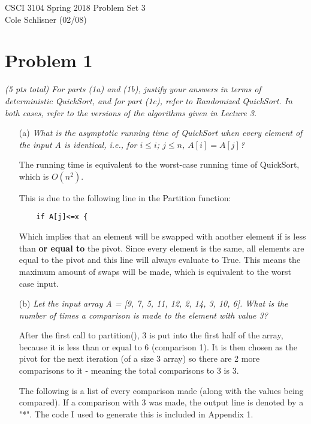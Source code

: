 \documentclass[12pt]{article} \setlength{\oddsidemargin}{0in}
\begin{document}
\noindent CSCI 3104 Spring 2018 \hfill Problem Set 3\\
Cole Schlisner (02/08)

\hrulefill

{\selectfont

  \section*{Problem 1}

  \textit{(5 pts total) For parts (1a) and (1b), justify your answers
    in terms of deterministic QuickSort, and for part (1c), refer to
    Randomized QuickSort. In both cases, refer to the versions of the
    algorithms given in Lecture 3.}

  \begin{enumerate}
  \item[(a)]{\textit{What is the asymptotic running time of QuickSort when
      every element of the input A is identical, i.e., for $i \le i$;
      $j \le n$, $A[i] = A[j]$?}}
    
    The running time is equivalent to the worst-case running time of QuickSort, which is $O(n^2)$. 

    This is due to the following line in the Partition function: 
    \begin{verbatim}
    if A[j]<=x {
    \end{verbatim}

    Which implies that an element will be swapped with another element if is less than \textbf{or equal to} the pivot. Since every element is the same, all elements are equal to the pivot and this line will always evaluate to True. This means the maximum amount of swaps will be made, which is equivalent to the worst case input. 

    \newpage

  \item[(b)]{\textit{Let the input array A = [9, 7, 5, 11, 12, 2, 14, 3, 10,
      6]. What is the number of times a comparison is made to the
      element with value 3?}}

    After the first call to partition(), 3 is put into the first half of the array, because it is less than or equal to 6 (comparison 1). It is then chosen as the pivot for the next iteration (of a size 3 array) so there are 2 more comparisons to it - meaning the total comparisons to 3 is 3. 
    
    The following is a list of every comparison made (along with the values being compared). If a comparison with 3 was made, the output line is denoted by a "*". The code I used to generate this is included in Appendix 1. 


\end{enumerate}}
\end{document}
